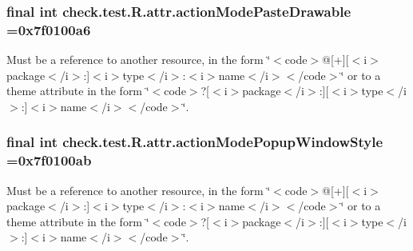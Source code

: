 \subsubsection[{action\+Mode\+Paste\+Drawable}]{\setlength{\rightskip}{0pt plus 5cm}final int check.\+test.\+R.\+attr.\+action\+Mode\+Paste\+Drawable =0x7f0100a6\hspace{0.3cm}{\ttfamily [static]}}\label{classcheck_1_1test_1_1_r_1_1attr_aff7427a6bcd20189d4b6af36b92fccdd}
Must be a reference to another resource, in the form \char`\"{}$<$code$>$@\mbox{[}+\mbox{]}\mbox{[}$<$i$>$package$<$/i$>$\+:\mbox{]}$<$i$>$type$<$/i$>$\+:$<$i$>$name$<$/i$>$$<$/code$>$\char`\"{} or to a theme attribute in the form \char`\"{}$<$code$>$?\mbox{[}$<$i$>$package$<$/i$>$\+:\mbox{]}\mbox{[}$<$i$>$type$<$/i$>$\+:\mbox{]}$<$i$>$name$<$/i$>$$<$/code$>$\char`\"{}. \hypertarget{classcheck_1_1test_1_1_r_1_1attr_a9f20226af5f3450ddc9b63afe84c2e96}{}
\subsubsection[{action\+Mode\+Popup\+Window\+Style}]{\setlength{\rightskip}{0pt plus 5cm}final int check.\+test.\+R.\+attr.\+action\+Mode\+Popup\+Window\+Style =0x7f0100ab\hspace{0.3cm}{\ttfamily [static]}}\label{classcheck_1_1test_1_1_r_1_1attr_a9f20226af5f3450ddc9b63afe84c2e96}
Must be a reference to another resource, in the form \char`\"{}$<$code$>$@\mbox{[}+\mbox{]}\mbox{[}$<$i$>$package$<$/i$>$\+:\mbox{]}$<$i$>$type$<$/i$>$\+:$<$i$>$name$<$/i$>$$<$/code$>$\char`\"{} or to a theme attribute in the form \char`\"{}$<$code$>$?\mbox{[}$<$i$>$package$<$/i$>$\+:\mbox{]}\mbox{[}$<$i$>$type$<$/i$>$\+:\mbox{]}$<$i$>$name$<$/i$>$$<$/code$>$\char`\"{}. \hypertarget{classcheck_1_1test_1_1_r_1_1attr_a3c633deb9c01f4bdde7415f1db6815b0}{}
